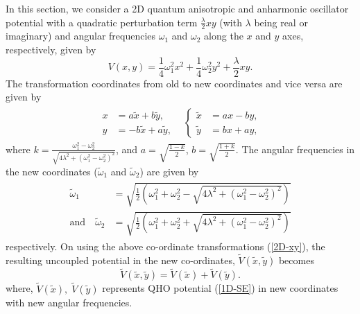 \documentclass[a4paper, 12pt]{article}
\newcommand{\td}[1]{\tilde{#1}}
\begin{document}
In this section, we consider a 2D quantum anisotropic and anharmonic oscillator potential with a quadratic perturbation term $\frac{\lambda}{2} xy$ (with $\lambda$ being real or imaginary) and angular frequencies \( \omega_1 \) and \( \omega_2 \) along the \( x \) and \( y \) axes, respectively, given by
\begin{equation}\label{2D-V-II}
  V(x,y)= \frac{1}{4}\omega_1^2x^2+\frac{1}{4}\omega_2^2y^2+\frac{\lambda}{2} xy.
\end{equation}
The transformation coordinates \cite{mandal2013pt} from old to new coordinates and vice versa are given by
\begin{align}\label{2D-xy}
  \begin{split}
  \begin{aligned}
      x &= a\td{x}+b\td{y}, \\
      y &= -b\td{x}+a\td{y},
  \end{aligned}
  & 
  \left\{
  \begin{aligned}
      \td{x} &= ax-by, \\
      \td{y} &=bx+ay,
  \end{aligned}
  \right.
  \end{split}
\end{align}
where \( k =\frac{\omega_1^2-\omega_2^2}{\sqrt{4\lambda^2+(\omega_1^2-\omega_2^2)^2}}\), and $a=\sqrt{\frac{1-k}{2}}$, $b=\sqrt{\frac{1+k}{2}}$. The angular frequencies in the new coordinates ($\td{\omega}_1$ and $\td{\omega}_2$) are given by
\begin{align}\label{2D-omega'}
  \begin{split}
    \td{\omega}_1 &= \sqrt{\frac{1}{2} \left(\omega_1^2+\omega_2^2-\sqrt{4\lambda^2+(\omega_1^2-\omega_2^2)^2}\right)}\\
 \mbox{and} \quad \td{\omega}_2 &= \sqrt{\frac{1}{2} \left(\omega_1^2+\omega_2^2+\sqrt{4\lambda^2+(\omega_1^2-\omega_2^2)^2}\right)}
  \end{split}
\end{align}
respectively. On using the above co-ordinate transformations (\ref{2D-xy}), the resulting uncoupled potential in the new co-ordinates, $\tilde{V}(\td{x},\td{y})$ becomes
\begin{equation}\label{2D-V-II'}
  \tilde{V}(\td{x},\td{y})= \td{V}(\td{x})+\td{V}(\td{y}).  
\end{equation}
where, $\td{V}(\td{x}),\;\td{V}(\td{y})$ represents QHO potential (\ref{1D-SE}) in new coordinates with new angular frequencies.
\end{document}
